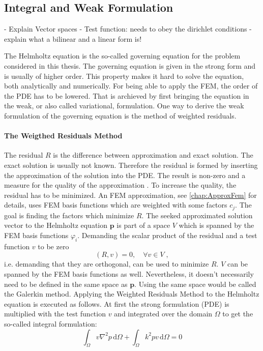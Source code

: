 \documentclass[%
  a4paper,oneside,%
  11pt,%
  smallchapters,
  style=printdev,
  extramargin,
  green,%
  rgb, <cmyk>
  ]{tubsbook}
\begin{document}
\subsection{Integral and Weak Formulation}
- Explain Vector spaces
- Test function: needs to obey the dirichlet conditions
- explain what a bilinear and a linear form is!


The Helmholtz equation is the so-called governing equation for the problem considered in this thesis. The governing equation is given in the strong form and is usually of higher order. This property makes it hard to solve the equation, both analytically and numerically. For being able to apply the FEM, the order of the PDE has to be lowered. That is archieved by first bringing the equation in the weak, or also called variational, formulation.
One way to derive the weak formulation of the governing equation is the method of weighted residuals. 
\paragraph{The Weigthed Residuals Method}
The residual $R$ is the difference between approximation and exact solution. The exact solution is usually not known. Therefore the residual is formed by inserting the approximation of the solution into the PDE. The result is non-zero and a measure for the quality of the approximation \cite{langtangen2019}. To increase the quality, the residual has to be minimized. 
An FEM approximation, see \ref{chap:ApproxFem} for details, uses FEM basis functions which are weighted with some factors $c_j$. The goal is finding the factors which minimize $R$. The seeked approximated solution vector to the Helmholtz equation $\bm{p}$ is part of a space $V$ which is spanned by the FEM basis functions $\varphi_i$. Demanding the scalar product of the residual and a test function $v$ to be zero
\begin{equation}
(R,v) = 0, \quad \forall v \in V \;,
\end{equation}
i.e. demanding that they are orthogonal, can be used to minimize $R$. $V$ can be spanned by the FEM basis functions as well. Nevertheless, it doesn't necessarily need to be defined in the same space as $\bm{p}$. Using the same space would be called the Galerkin method. Applying the Weighted Residuals Method to the Helmholtz equation is executed as follows.
At first the strong formulation (PDE) is multiplied with the test function $v$ and integrated over the domain $\Omega$ to get the so-called integral formulation:
\begin{equation}
\int_{\Omega} v \nabla^2 p \,\mathrm{d}\Omega + \int_{\Omega} k^2 pv \,\mathrm{d}\Omega = 0
\label{eqn:IntForm}
\end{equation}
%
\end{document}
